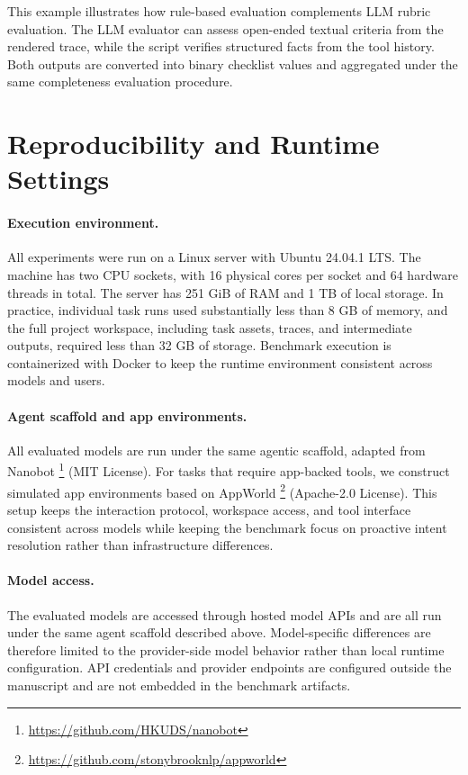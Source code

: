 \documentclass{llmxive}
\begin{document}
This example illustrates how rule-based evaluation complements LLM rubric evaluation. The LLM evaluator can assess open-ended textual criteria from the rendered trace, while the script verifies structured facts from the tool history. Both outputs are converted into binary checklist values and aggregated under the same completeness evaluation procedure.

\section{Reproducibility and Runtime Settings}
\label{app:exp_settings}

\paragraph{Execution environment.}
All experiments were run on a Linux server with Ubuntu 24.04.1 LTS. The machine has two CPU sockets, with 16 physical cores per socket and 64 hardware threads in total. The server has 251 GiB of RAM and 1 TB of local storage. In practice, individual task runs used substantially less than 8 GB of memory, and the full project workspace, including task assets, traces, and intermediate outputs, required less than 32 GB of storage. Benchmark execution is containerized with Docker to keep the runtime environment consistent across models and users.

\paragraph{Agent scaffold and app environments.}
All evaluated models are run under the same agentic scaffold, adapted from Nanobot \citep{nanobot}\footnote{\url{https://github.com/HKUDS/nanobot}} (MIT License). For tasks that require app-backed tools, we construct simulated app environments based on AppWorld \citep{trivedi2024appworld}\footnote{\url{https://github.com/stonybrooknlp/appworld}} (Apache-2.0 License). This setup keeps the interaction protocol, workspace access, and tool interface consistent across models while keeping the benchmark focus on proactive intent resolution rather than infrastructure differences.

\paragraph{Model access.}
The evaluated models are accessed through hosted model APIs and are all run under the same agent scaffold described above. Model-specific differences are therefore limited to the provider-side model behavior rather than local runtime configuration. API credentials and provider endpoints are configured outside the manuscript and are not embedded in the benchmark artifacts.
\end{document}
